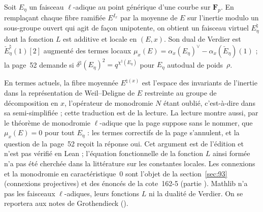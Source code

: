 \begin{encadre}
\begin{exemple*}\nonverifie
Soit $E_\eta$ un faisceau $\ell$-adique au point générique d'une courbe sur $\mathbf F_p$. En remplaçant chaque fibre ramifiée $E^{I_x}$ par la moyenne de $E$ sur l'inertie modulo un sous-groupe ouvert qui agit de façon unipotente, on obtient un faisceau virtuel $E_\eta^\natural$ dont la fonction $L$ est additive et locale en $(E, x)$. Son dual de Verdier est $\check E_\eta^\natural(1)[2]$ augmenté des termes locaux $\mu_x(E) = \alpha_x(E_\eta)^\vee - \alpha_x(\check E_\eta)(1)$ ; la page~52 demande si $\delta^\natural(E_\eta)^2 = q^{\chi^\natural(E_\eta)}$ pour $E_\eta$ autodual de poids~$\rho$.
\end{exemple*}
\end{encadre}
{\small En termes actuels, la fibre moyennée $E^{\natural(x)}$ est l'espace des invariants de l'inertie dans la représentation de Weil--Deligne de $E$ restreinte au groupe de décomposition en $x$, l'opérateur de monodromie $N$ étant oublié, c'est-à-dire dans sa semi-simplifiée ; cette traduction est de la lecture. La lecture montre aussi, par le théorème de monodromie $\ell$-adique que la page suppose sans le nommer, que $\mu_x(E) = 0$ pour tout $E_\eta$ : les termes correctifs de la page s'annulent, et la question de la page~52 reçoit la réponse oui. Cet argument est de l'édition et n'est pas vérifié en Lean ; l'équation fonctionnelle de la fonction $L$ ainsi formée n'a pas été cherchée dans la littérature sur les constantes locales. Les connexions et la monodromie en caractéristique~$0$ sont l'objet de la section~\ref{sec:93} (connexions projectives) et des énoncés de la cote~162-5 (partie ). Mathlib n'a pas les faisceaux $\ell$-adiques, leurs fonctions $L$ ni la dualité de Verdier. On se reportera aux notes de Grothendieck ().\par}

